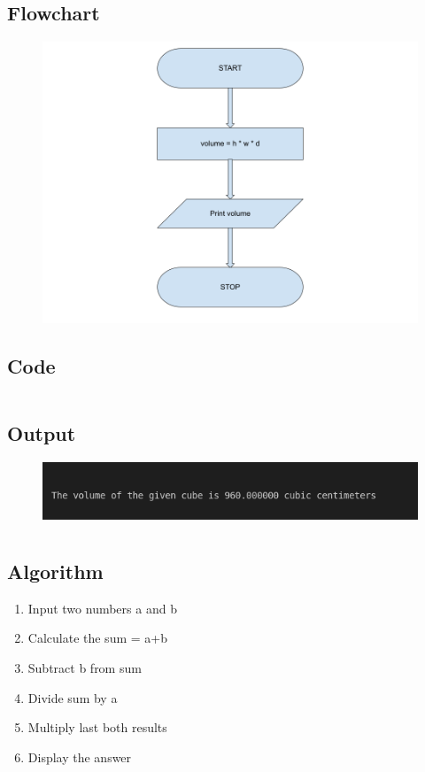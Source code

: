 \documentclass[12pt]{article}
\begin{document}
\subsection{Flowchart}
\begin{figure}[h]
    \centering
    \includegraphics[width=1.0\textwidth]{Flowchart01.png}
\end{figure}
\newpage
\subsection{Code}
\inputminted{c}{q1.c}
\subsection{Output}
\begin{figure}[h]
    \centering
    \includegraphics[width=1.0\textwidth]{1.png}
\end{figure}
\newpage
\section{}
\subsection{Algorithm}
\begin{enumerate}
    \item Input two numbers a and b
    \item Calculate the sum = a+b
    \item Subtract b from sum
    \item Divide sum by a
    \item Multiply last both results
    \item Display the answer
\end{enumerate}
\end{document}
